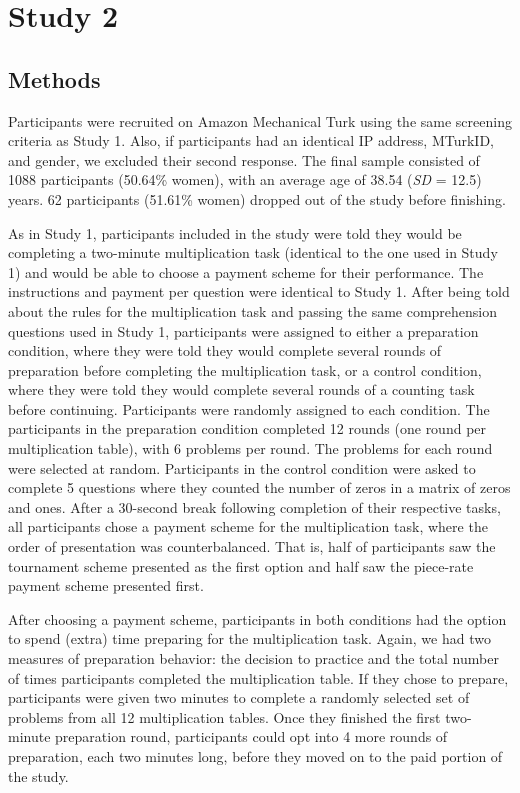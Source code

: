 \documentclass[a4paper, nobind]{templates/ociamthesis}
\begin{document}
\hypertarget{study-2}{%
\section{Study 2}\label{study-2}}

\hypertarget{methods-1}{%
\subsection{Methods}\label{methods-1}}

Participants were recruited on Amazon Mechanical Turk using the same screening criteria as Study 1. Also, if participants had an identical IP address, MTurkID, and gender, we excluded their second response. The final sample consisted of 1088 participants (50.64\% women), with an average age of 38.54 (\emph{SD} = 12.5) years. 62 participants (51.61\% women) dropped out of the study before finishing.

As in Study 1, participants included in the study were told they would be completing a two-minute multiplication task (identical to the one used in Study 1) and would be able to choose a payment scheme for their performance. The instructions and payment per question were identical to Study 1. After being told about the rules for the multiplication task and passing the same comprehension questions used in Study 1, participants were assigned to either a preparation condition, where they were told they would complete several rounds of preparation before completing the multiplication task, or a control condition, where they were told they would complete several rounds of a counting task before continuing. Participants were randomly assigned to each condition. The participants in the preparation condition completed 12 rounds (one round per multiplication table), with 6 problems per round. The problems for each round were selected at random. Participants in the control condition were asked to complete 5 questions where they counted the number of zeros in a matrix of zeros and ones. After a 30-second break following completion of their respective tasks, all participants chose a payment scheme for the multiplication task, where the order of presentation was counterbalanced. That is, half of participants saw the tournament scheme presented as the first option and half saw the piece-rate payment scheme presented first.

After choosing a payment scheme, participants in both conditions had the option to spend (extra) time preparing for the multiplication task. Again, we had two measures of preparation behavior: the decision to practice and the total number of times participants completed the multiplication table. If they chose to prepare, participants were given two minutes to complete a randomly selected set of problems from all 12 multiplication tables. Once they finished the first two-minute preparation round, participants could opt into 4 more rounds of preparation, each two minutes long, before they moved on to the paid portion of the study.
\end{document}
